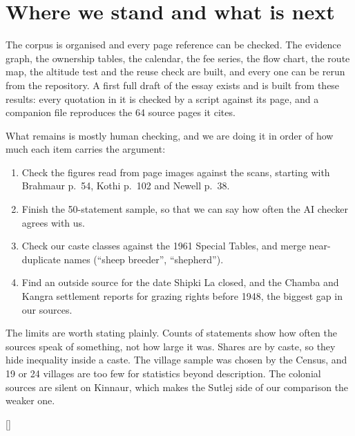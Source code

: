 \documentclass[10pt,a4paper,twocolumn]{article}
\begin{document}
\section{Where we stand and what is next}\label{sec:next}

The corpus is organised and every page reference can be checked. The evidence graph, the ownership tables, the calendar, the fee series, the flow chart, the route map, the altitude test and the reuse check are built, and every one can be rerun from the repository. A first full draft of the essay exists and is built from these results: every quotation in it is checked by a script against its page, and a companion file reproduces the 64 source pages it cites.

What remains is mostly human checking, and we are doing it in order of how much each item carries the argument:

\begin{enumerate}
\item Check the figures read from page images against the scans, starting with Brahmaur p.~54, Kothi p.~102 and Newell p.~38.
\item Finish the 50-statement sample, so that we can say how often the AI checker agrees with us.
\item Check our caste classes against the 1961 Special Tables, and merge near-duplicate names (``sheep breeder'', ``shepherd'').
\item Find an outside source for the date Shipki La closed, and the Chamba and Kangra settlement reports for grazing rights before 1948, the biggest gap in our sources.
\end{enumerate}

The limits are worth stating plainly. Counts of statements show how often the sources speak of something, not how large it was. Shares are by caste, so they hide inequality inside a caste. The village sample was chosen by the Census, and 19 or 24 villages are too few for statistics beyond description. The colonial sources are silent on Kinnaur, which makes the Sutlej side of our comparison the weaker one.

\onecolumn
\appendix
{}[{\color{maroon!35}\titlerule}]
\end{document}
